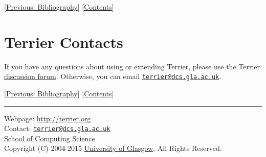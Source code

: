 {[}\href{bibliography.html}{Previous: Bibliography}{]}
{[}\href{index.html}{Contents}{]}

\section{Terrier Contacts}\label{terrier-contacts}

If you have any questions about using or extending Terrier, please use
the Terrier \href{http://terrier.org/forum/}{discussion forum}.
Otherwise, you can email
\href{mailto:terrier@dcs.gla.ac.uk}{\nolinkurl{terrier@dcs.gla.ac.uk}}.

{[}\href{bibliography.html}{Previous: Bibliography}{]}
{[}\href{index.html}{Contents}{]}

\begin{center}\rule{0.5\linewidth}{\linethickness}\end{center}

Webpage: \url{http://terrier.org}\\
Contact:
\href{mailto:terrier@dcs.gla.ac.uk}{\nolinkurl{terrier@dcs.gla.ac.uk}}\\
\href{http://www.dcs.gla.ac.uk/}{School of Computing Science}\\
Copyright (C) 2004-2015 \href{http://www.gla.ac.uk/}{University of
Glasgow}. All Rights Reserved.
